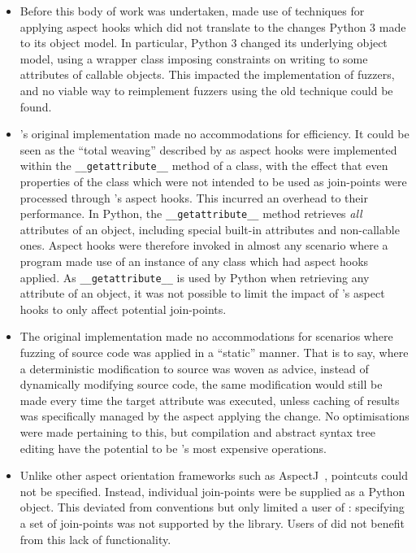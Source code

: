 \begin{itemize}
    \item Before this body of work was undertaken, \pdsf made use of techniques
      for applying aspect hooks which did not translate to the changes Python 3
      made to its object model. In particular, Python 3 changed its underlying
      object model, using a wrapper class imposing constraints on writing to
      some attributes of callable objects. This impacted the implementation of
      fuzzers, and no viable way to reimplement fuzzers using the old technique
      could be found.
    \item \pdsf{}'s original implementation made no accommodations for
      efficiency. It could be seen as the ``total weaving'' described by
      \citet{dynamicAOchitchyan} as aspect hooks were implemented within the
      \lstinline{__getattribute__} method of a class, with the effect that even
      properties of the class which were not intended to be used as join-points
      were processed through \pdsf{}'s aspect hooks. This incurred an overhead
      to their performance. In Python, the \lstinline{__getattribute__} method
      retrieves \emph{all} attributes of an object, including special built-in
      attributes and non-callable ones. Aspect hooks were therefore invoked in
      almost any scenario where a program made use of an instance of any class
      which had aspect hooks applied. As \lstinline{__getattribute__} is used by
      Python when retrieving any attribute of an object, it was not possible to
      limit the impact of \pdsf{}'s aspect hooks to only affect potential
      join-points.
    \item The original \pdsf implementation made no accommodations for scenarios
      where fuzzing of source code was applied in a ``static'' manner. That is
      to say, where a deterministic modification to source was woven as advice,
      instead of dynamically modifying source code, the same modification would
      still be made every time the target attribute was executed, unless caching
      of results was specifically managed by the aspect applying the change. No
      optimisations were made pertaining to this, but compilation and abstract
      syntax tree editing have the potential to be \pdsf{}'s most expensive
      operations.
    \item Unlike other aspect orientation frameworks such as
      AspectJ~\cite{aspectj_intro}, pointcuts could not be specified. Instead,
      individual join-points were be supplied as a Python object. This deviated
      from \aop{} conventions but only limited a user of \pdsf{}: specifying a
      set of join-points was not supported by the library. Users of \pdsf{} did
      not benefit from this lack of functionality.
\end{itemize}

